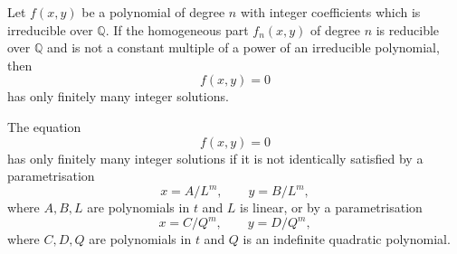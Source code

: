 \begin{proposition}
    Let $f(x,y)$ be a polynomial of degree $n$ with integer coefficients which is irreducible over $\mathbb{Q}$. If the homogeneous part $f_n(x,y)$ of degree $n$ is reducible over $\mathbb{Q}$ and is not a constant multiple of a power of an irreducible polynomial, then
\[
    f(x,y)=0
\]
    has only finitely many integer solutions.
\end{proposition}

\begin{proposition}
    The equation
\[
    f(x,y)=0
\]
    has only finitely many integer solutions if it is not identically satisfied by a parametrisation
\[
    x=A/L^m,\qquad y=B/L^m,
\]
    where $A,B,L$ are polynomials in $t$ and $L$ is linear, or by a parametrisation
\[
    x=C/Q^m,\qquad y=D/Q^m,
\]
    where $C,D,Q$ are polynomials in $t$ and $Q$ is an indefinite quadratic polynomial.
\end{proposition}
